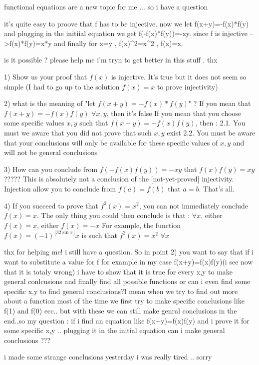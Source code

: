 \begin{solution}
	\begin{tcolorbox}functional equations are a new topic for me ... so i have a question 

it's quite easy to proove that f has to be injective.
now we let f(x+y)=-f(x)*f(y)
and plugging in the initiial equation we get f(-f(x)*f(y))=-xy.
since f is injective -->f(x)*f(y)=x*y
and finally for x=y , f(x)^2=x^2 , f(x)=x.

is it possible ? please help me i'm tryn to get better in this stuff . 
thx\end{tcolorbox}
1) Show us your proof that $f(x)$ is injective. It's true but it does not seem so simple (I had to go up to the solution $f(x)=x$ to prove injectivity)

2) what is the meaning of "let $f(x+y)=-f(x)*f(y)$" ?
If you mean that $f(x+y)=-f(x)f(y)$ $\forall x,y$, then it's false
If you mean that you choose some specific values $x,y$ such that  $f(x+y)=-f(x)f(y)$, then :
2.1. You must we aware that you did not prove that such $x,y$ exist
2.2. You must be aware that your conclusions will only be available for these specific values of $x,y$ and will not be general conclusions

3) How can you conclude from $f(-f(x)f(y))=-xy$ that $f(x)f(y)=xy$ ????? This is absolutely not a conclusion of the [not-yet-proved] injectivity.
Injection allow you to conclude from $f(a)=f(b)$ that $a=b$. That's all.

4) If you succeed to prove that $f^2(x)=x^2$, you can not immediately conclude $f(x)=x$. The only thing you could then conclude is that :
$\forall x$, either $f(x)=x$, either $f(x)=-x$
For example, the function $f(x)=(-1)^{\lfloor 32\sin x\rfloor}x$ is such that $f^2(x)=x^2$ $\forall x$
\end{solution}



\begin{solution}
	thx for helping me! i still have a question.
So in point 2) you want to say that if i want to substitute a value for f
for example in my case f(x+y)=f(x)f(y)(i see now that it is totaly wrong) i have to show that it is true for 
every x,y  to make general conlcusions and finally find all possible functions or can i even find some specific
x,y  to find general conclusions?I mean when we try to find out more about a function most of the time we first try to make specific conclusions like f(1) and f(0) ecc.. but with these we can still make genral conclusions in the end..so my question : if i find an equation like f(x+y)=f(x)f(y) and i prove it for  some specific x,y .. plugging it in the initial  equation can i make general conclusions ??? 

i made some strange conclusions yesterday i was really tired .. sorry
\end{solution}



